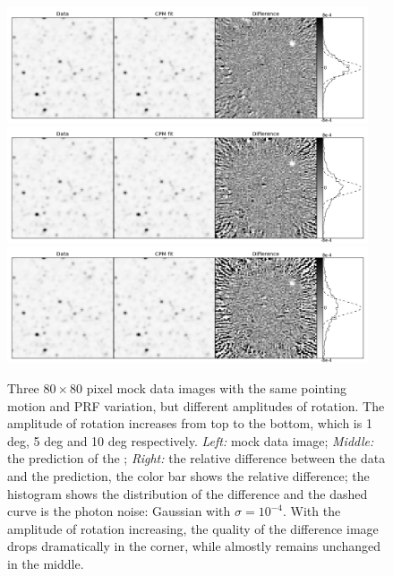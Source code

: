 \begin{figure}[p]
\begin{center}
\includegraphics[width=0.95\textwidth]{figures/cdi/f8a}
\includegraphics[width=0.95\textwidth]{figures/cdi/f8b}
\includegraphics[width=0.95\textwidth]{figures/cdi/f8c}
\end{center}
\caption[\cpmdiff\ with large detector rotation]{
  \label{large_rotation}
  Three $80\times 80$ pixel mock data images with the same pointing motion and PRF variation, but different amplitudes of rotation. The amplitude of rotation increases from top to the bottom, which is 1 deg, 5 deg and 10 deg respectively.
  \emph{Left:} mock data image;
  \emph{Middle:} the prediction of the \cpmdiff;
  \emph{Right:} the relative difference between the data and the prediction, the color bar shows the relative difference; the histogram shows the distribution of the difference and the dashed curve is the photon noise: Gaussian with $\sigma = 10^{-4}$. 
  With the amplitude of rotation increasing, the quality of the difference image drops dramatically in the corner, while almostly remains unchanged in the middle.
}
\end{figure}

